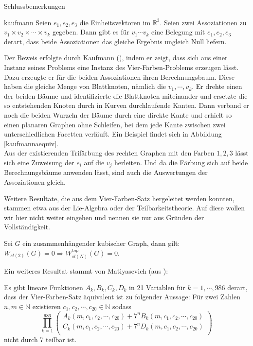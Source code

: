 \begin{chapter}{Schlussbemerkungen}
 \begin{satzl}{ }{kaufmann}
  Seien $e_1, e_2, e_3$ die Einheitsvektoren im $\mathbb{R}^3$. Seien zwei Assoziationen zu $v_1 \times v_2 \times \cdots \times v_k$ gegeben. Dann gibt es für $v_1 \cdots v_k$ eine Belegung mit $e_1,e_2,e_3$ derart, dass beide Assoziationen das gleiche Ergebnis ungleich Null liefern.
 \end{satzl}
 
 Der Beweis erfolgte durch Kaufmann (\cite{kaufmann}), indem er zeigt, dass sich aus einer Instanz seines Problems eine Instanz des Vier-Farben-Problems erzeugen lässt. Dazu erzeugte er für die beiden Assoziationen ihren Berechnungsbaum. Diese haben die gleiche Menge von Blattknoten, nämlich die $v_1,\cdots,v_k$. Er drehte einen der beiden Bäume und identifizierte die Blattknoten miteinander und ersetzte die so entstehenden Knoten durch in Kurven durchlaufende Kanten. Dann verband er noch die beiden Wurzeln der Bäume durch eine direkte Kante und erhielt so einen planaren Graphen ohne Schleifen, bei dem jede Kante zwischen zwei unterschiedlichen Facetten verläuft. Ein Beispiel findet sich in Abbildung \ref{kaufmannaequiv}.\\
 Aus der existierenden Trifärbung des rechten Graphen mit den Farben $1,2,3$ lässt sich eine Zuweisung der $e_i$ auf die $v_j$ herleiten. Und da die Färbung sich auf beide Berechnungsbäume anwenden lässt, sind auch die Auswertungen der Assoziationen gleich.
 
 Weitere Resultate, die aus dem Vier-Farben-Satz hergeleitet werden konnten, stammen etwa aus der Lie-Algebra oder der Teilbarkeitstheorie. Auf diese wollen wir hier nicht weiter eingehen und nennen sie nur aus Gründen der Vollständigkeit.
 
 \begin{satz}{}
  Sei $G$ ein zusammenhängender kubischer Graph, dann gilt: $W_{sl(2)}(G) = 0 \Rightarrow W_{sl(N)}^{top}(G) = 0$.
 \end{satz}
 
 Ein weiteres Resultat stammt von Matiyasevich (aus \cite{matiyasevich}):
 
 \begin{satz}{}
  Es gibt lineare Funktionen $A_k,B_k,C_k,D_k$ in 21 Variablen für $k = 1,\cdots,986$ derart, dass der Vier-Farben-Satz äquivalent ist zu folgender Aussage: Für zwei Zahlen $n,m \in \mathbb{N}$ existieren $c_1,c_2,\cdots,c_{20} \in \mathbb{N}$ sodass
  \[ \prod_{k=1}^{986} \begin{pmatrix}
                        A_k(m,c_1,c_2,\cdots,c_{20})+7^nB_k(m,c_1,c_2,\cdots,c_{20}) \\
                        C_k(m,c_1,c_2,\cdots,c_{20})+7^nD_k(m,c_1,c_2,\cdots,c_{20}) \\
                       \end{pmatrix} \]
  nicht durch 7 teilbar ist.
 \end{satz}
\end{chapter}